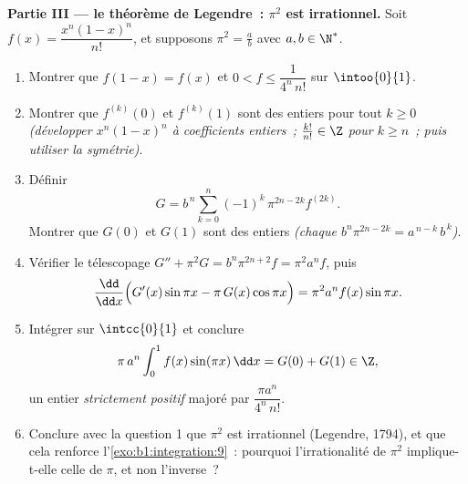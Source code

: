 \begin{problem}
\medskip
\noindent\textbf{Partie III --- le théorème de Legendre~: $\pi^2$ est
irrationnel.} Soit $f(x) = \dfrac{x^n (1 - x)^n}{n!}$, et supposons
$\pi^2 = \frac ab$ avec $a, b \in \N^*$.
\begin{enumerate}[resume]
  \item Montrer que $f(1 - x) = f(x)$ et $0 < f \leq
        \dfrac{1}{4^n\,n!}$ sur $\intoo{0}{1}$.
  \item Montrer que $f^{(k)}(0)$ et $f^{(k)}(1)$ sont des entiers
        pour tout $k \geq 0$ \emph{(développer $x^n(1-x)^n$ à
        coefficients entiers~; $\frac{k!}{n!} \in \Z$ pour $k \geq
        n$~; puis utiliser la symétrie)}.
  \item Définir
        \[
        G = b^{\,n} \sum_{k=0}^{n} (-1)^k\,
        \pi^{2n - 2k} f^{(2k)} .
        \]
        Montrer que $G(0)$ et $G(1)$ sont des entiers \emph{(chaque
        $b^n \pi^{2n-2k} = a^{\,n-k}\,b^{\,k}$)}.
  \item Vérifier le télescopage $G'' + \pi^2 G = b^n \pi^{2n+2} f
        = \pi^2 a^n f$, puis
        \[
        \frac{\dd}{\dd x}\Bigl(G'(x)\sin \pi x - \pi\,G(x)\cos
        \pi x\Bigr) = \pi^2 a^n f(x)\sin \pi x .
        \]
  \item Intégrer sur $\intcc{0}{1}$ et conclure
        \[
        \pi\,a^n \int_0^1 f(x)\sin(\pi x)\,\dd x = G(0) + G(1)
        \in \Z ,
        \]
        un entier \emph{strictement positif} majoré par $\dfrac{\pi
        a^n}{4^n\,n!}$.
  \item Conclure avec la question 1 que $\pi^2$ est irrationnel
        (Legendre, 1794), et que cela renforce
        l'\cref{exo:b1:integration:9}~: pourquoi l'irrationalité de
        $\pi^2$ implique-t-elle celle de $\pi$, et non l'inverse~?
\end{enumerate}


\end{problem}
